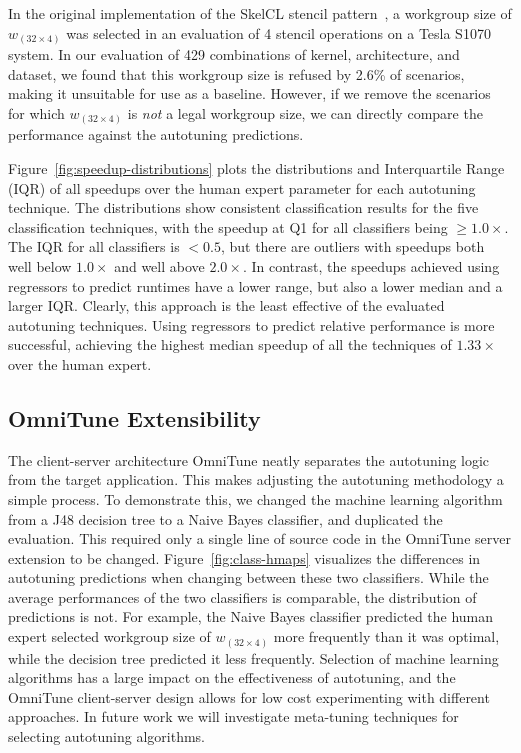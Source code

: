   In the original implementation of the SkelCL stencil
  pattern~\cite{Steuwer2014a}, a workgroup size of $w_{(32 \times 4)}$
  was selected in an evaluation of 4 stencil operations on a Tesla S1070
  system. In our evaluation of 429 combinations of kernel, architecture,
  and dataset, we found that this workgroup size is refused by 2.6\% of
  scenarios, making it unsuitable for use as a baseline. However, if we
  remove the scenarios for which $w_{(32 \times 4)}$ is \emph{not} a
  legal workgroup size, we can directly compare the performance against
  the autotuning predictions.

  Figure~\ref{fig:speedup-distributions} plots the distributions and
  Interquartile Range (IQR) of all speedups over the human expert
  parameter for each autotuning technique. The distributions show
  consistent classification results for the five classification
  techniques, with the speedup at Q1 for all classifiers being
  $\ge 1.0\times$. The IQR for all classifiers is $< 0.5$, but there are
  outliers with speedups both well below $1.0\times$ and well above
  $2.0\times$. In contrast, the speedups achieved using regressors to
  predict runtimes have a lower range, but also a lower median and a
  larger IQR. Clearly, this approach is the least effective of the
  evaluated autotuning techniques. Using regressors to predict relative
  performance is more successful, achieving the highest median speedup
  of all the techniques of $1.33\times$ over the human expert.


  \subsection{OmniTune Extensibility}

  The client-server architecture OmniTune neatly separates the
  autotuning logic from the target application. This makes adjusting the
  autotuning methodology a simple process. To demonstrate this, we
  changed the machine learning algorithm from a J48 decision tree to a
  Naive Bayes classifier, and duplicated the evaluation. This required
  only a single line of source code in the OmniTune server extension to
  be changed. Figure~\ref{fig:class-hmaps} visualizes the differences in
  autotuning predictions when changing between these two
  classifiers. While the average performances of the two classifiers is
  comparable, the distribution of predictions is not. For example, the
  Naive Bayes classifier predicted the human expert selected workgroup
  size of $w_{(32 \times 4)}$ more frequently than it was optimal, while
  the decision tree predicted it less frequently. Selection of machine
  learning algorithms has a large impact on the effectiveness of
  autotuning, and the OmniTune client-server design allows for low cost
  experimenting with different approaches. In future work we will
  investigate meta-tuning techniques for selecting autotuning
  algorithms.

